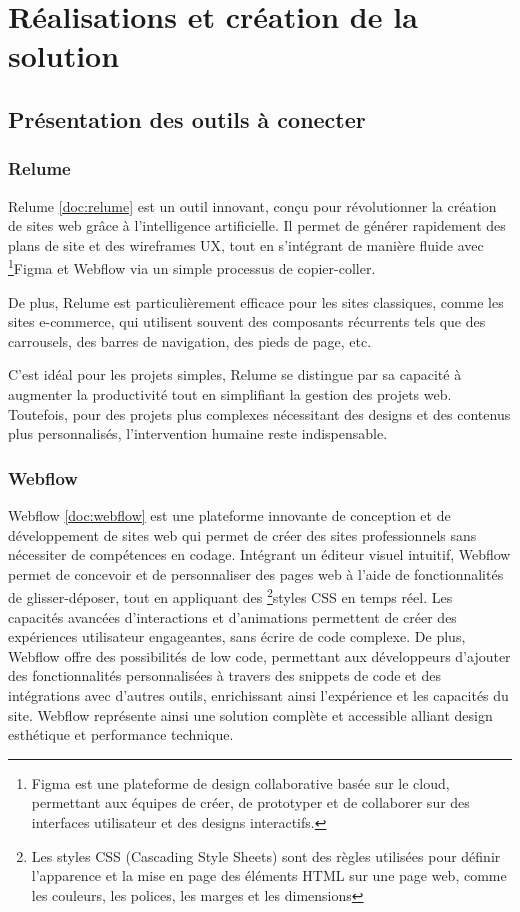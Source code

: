 \chapter{Réalisations et création de la solution}
\section{Présentation des outils à conecter}

\subsection{Relume}

Relume \ref{doc:relume} est un outil innovant, conçu pour révolutionner la création de sites web grâce à l'intelligence artificielle. Il permet de générer rapidement des plans de site et des wireframes UX, tout en s'intégrant de manière fluide avec \footnote{Figma est une plateforme de design collaborative basée sur le cloud, permettant aux équipes de créer, de prototyper et de collaborer sur des interfaces utilisateur et des designs interactifs.}Figma et Webflow via un simple processus de copier-coller. 

De plus, Relume est particulièrement efficace pour les sites classiques, comme les sites e-commerce, qui utilisent souvent des composants récurrents tels que des carrousels, des barres de navigation, des pieds de page, etc.

C'est idéal pour les projets simples, Relume se distingue par sa capacité à augmenter la productivité tout en simplifiant la gestion des projets web. Toutefois, pour des projets plus complexes nécessitant des designs et des contenus plus personnalisés, l’intervention humaine reste indispensable. 

\subsection{Webflow}
Webflow \ref{doc:webflow} est une plateforme innovante de conception et de développement de sites web qui permet de créer des sites professionnels sans nécessiter de compétences en codage. Intégrant un éditeur visuel intuitif, Webflow permet de concevoir et de personnaliser des pages web à l'aide de fonctionnalités de glisser-déposer, tout en appliquant des \footnote{Les styles CSS (Cascading Style Sheets) sont des règles utilisées pour définir l'apparence et la mise en page des éléments HTML sur une page web, comme les couleurs, les polices, les marges et les dimensions}styles CSS en temps réel. Les capacités avancées d'interactions et d'animations permettent de créer des expériences utilisateur engageantes, sans écrire de code complexe. De plus, Webflow offre des possibilités de low code, permettant aux développeurs d'ajouter des fonctionnalités personnalisées à travers des snippets de code et des intégrations avec d'autres outils, enrichissant ainsi l'expérience et les capacités du site. Webflow représente ainsi une solution complète et accessible alliant design esthétique et performance technique.

